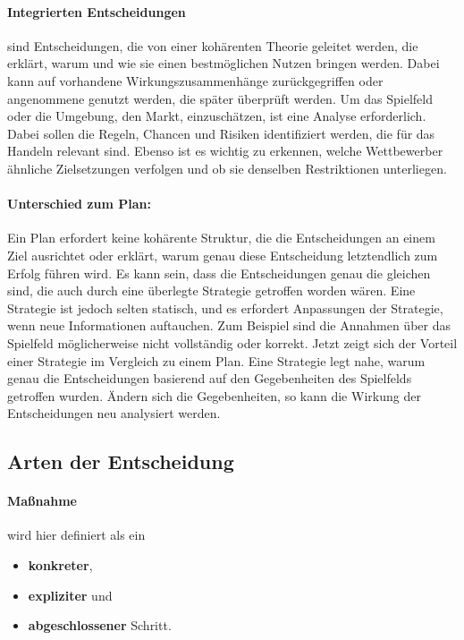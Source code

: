 \paragraph{Integrierten Entscheidungen} sind Entscheidungen, die von einer kohärenten Theorie geleitet werden, die erklärt, warum und wie sie einen bestmöglichen Nutzen bringen werden. Dabei kann auf vorhandene Wirkungszusammenhänge zurückgegriffen oder angenommene genutzt werden, die später überprüft werden. Um das Spielfeld oder die Umgebung, den Markt, einzuschätzen, ist eine Analyse erforderlich. Dabei sollen die Regeln, Chancen und Risiken identifiziert werden, die für das Handeln relevant sind. Ebenso ist es wichtig zu erkennen, welche Wettbewerber ähnliche Zielsetzungen verfolgen und ob sie denselben Restriktionen unterliegen.

\paragraph{Unterschied zum Plan:} Ein Plan erfordert keine kohärente Struktur, die die Entscheidungen an einem Ziel ausrichtet oder erklärt, warum genau diese Entscheidung letztendlich zum Erfolg führen wird. Es kann sein, dass die Entscheidungen genau die gleichen sind, die auch durch eine überlegte Strategie getroffen worden wären. Eine Strategie ist jedoch selten statisch, und es erfordert Anpassungen der Strategie, wenn neue Informationen auftauchen. Zum Beispiel sind die Annahmen über das Spielfeld möglicherweise nicht vollständig oder korrekt. Jetzt zeigt sich der Vorteil einer Strategie im Vergleich zu einem Plan. Eine Strategie legt nahe, warum genau die Entscheidungen basierend auf den Gegebenheiten des Spielfelds getroffen wurden. Ändern sich die Gegebenheiten, so kann die Wirkung der Entscheidungen neu analysiert werden.

\subsection{Arten der Entscheidung}


\paragraph{Maßnahme} wird hier definiert als ein

\begin{itemize}
	\item \textbf{konkreter},
	\item \textbf{expliziter} und
	\item \textbf{abgeschlossener} Schritt.
\end{itemize}

